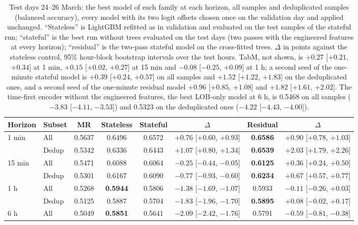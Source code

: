 \begin{table}[t]
\centering
\caption{Test days 24--26 March: the best model of each family at each horizon, all samples
and deduplicated samples (balanced accuracy), every model with its two logit offsets chosen
once on the validation day and applied unchanged.  ``Stateless'' is LightGBM refitted as in
validation and evaluated on the test samples of the stateful run; ``stateful'' is the best
run without trees evaluated on the test days (two passes with the engineered features at
every horizon); ``residual'' is the two-pass stateful model on the cross-fitted trees.  $\Delta$ in points against the stateless control,
95\% hour-block bootstrap intervals over the test hours.  TabM, not shown, is $+0.27$
[$+0.21$, $+0.34$] at 1 min, $+0.15$ [$+0.02$, $+0.27$] at 15 min and $-0.08$ [$-0.25$,
$+0.09$] at 1 h; a second seed of the one-minute stateful model is $+0.39$ [$+0.24$, $+0.57$]
on all samples and $+1.52$ [$+1.22$, $+1.83$] on the deduplicated ones, and a second seed
of the one-minute residual model $+0.96$ [$+0.85$, $+1.08$] and $+1.82$ [$+1.61$, $+2.02$].
The time-first encoder without the engineered features, the best LOB-only model at 6 h, is
0.5468 on all samples ($-3.83$ [$-4.11$, $-3.53$]) and 0.5323 on the deduplicated ones
($-4.22$ [$-4.43$, $-4.00$]).}
\label{tab:test:main}
\small
\begin{fittable}\begin{tabular}{llcccccc}
\toprule
Horizon & Subset & MR & Stateless & Stateful & $\Delta$ & Residual & $\Delta$ \\
\midrule
1 min  & All   & 0.5637 & 0.6496 & 0.6572 & $+0.76$ [$+0.60$, $+0.93$] & \textbf{0.6586} & $+0.90$ [$+0.78$, $+1.03$] \\
       & Dedup & 0.5342 & 0.6336 & 0.6443 & $+1.07$ [$+0.80$, $+1.34$] & \textbf{0.6539} & $+2.03$ [$+1.79$, $+2.26$] \\
15 min & All   & 0.5471 & 0.6088 & 0.6064 & $-0.25$ [$-0.44$, $-0.05$] & \textbf{0.6125} & $+0.36$ [$+0.24$, $+0.50$] \\
       & Dedup & 0.5301 & 0.6167 & 0.6090 & $-0.77$ [$-0.93$, $-0.60$] & \textbf{0.6234} & $+0.67$ [$+0.57$, $+0.77$] \\
1 h    & All   & 0.5268 & \textbf{0.5944} & 0.5806 & $-1.38$ [$-1.69$, $-1.07$] & 0.5933 & $-0.11$ [$-0.26$, $+0.03$] \\
       & Dedup & 0.5125 & 0.5887 & 0.5704 & $-1.83$ [$-1.96$, $-1.70$] & \textbf{0.5895} & $+0.08$ [$-0.02$, $+0.17$] \\
6 h    & All   & 0.5049 & \textbf{0.5851} & 0.5641 & $-2.09$ [$-2.42$, $-1.76$] & 0.5791 & $-0.59$ [$-0.81$, $-0.38$] \\

\end{tabular}
\end{fittable}
\end{table}
